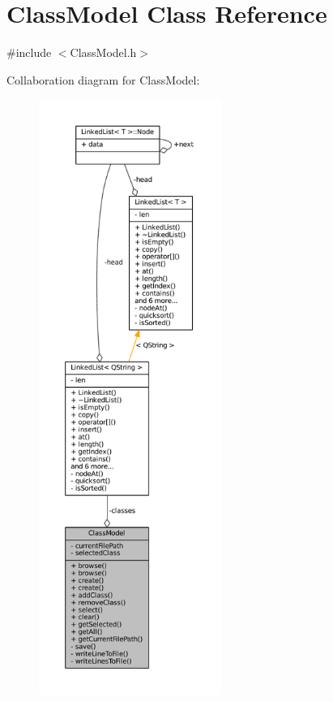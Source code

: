 \hypertarget{classClassModel}{}\section{Class\+Model Class Reference}
\label{classClassModel}


{\ttfamily \#include $<$Class\+Model.\+h$>$}



Collaboration diagram for Class\+Model\+:
\nopagebreak
\begin{figure}[H]
\begin{center}
\leavevmode
\includegraphics[height=550pt]{classClassModel__coll__graph}
\end{center}
\end{figure}
